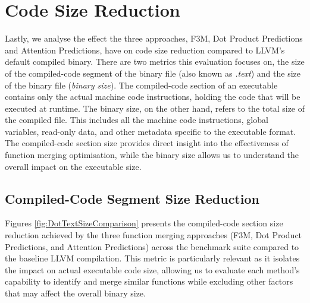 \section{Code Size Reduction} \label{Eval:CodeSizeReduction}
Lastly, we analyse the effect the three approaches, F3M, Dot Product Predictions and Attention Predictions, have on code size reduction compared to LLVM's default compiled binary. There are two metrics this evaluation focuses on, the size of the compiled-code segment of the binary file (also known as \textit{.text}) and the size of the binary file (\textit{binary size}). The compiled-code section of an executable contains only the actual machine code instructions, holding the code that will be executed at runtime. The binary size, on the other hand, refers to the total size of the compiled file. This includes all the machine code instructions, global variables, read-only data, and other metadata specific to the executable format. The compiled-code section size provides direct insight into the effectiveness of function merging optimisation, while the binary size allows us to understand the overall impact on the executable size.


\subsection{Compiled-Code Segment Size Reduction}
Figures \ref{fig:DotTextSizeComparison} presents the compiled-code section size reduction achieved by the three function merging approaches (F3M, Dot Product Predictions, and Attention Predictions) across the benchmark suite compared to the baseline LLVM compilation. This metric is particularly relevant as it isolates the impact on actual executable code size, allowing us to evaluate each method's capability to identify and merge similar functions while excluding other factors that may affect the overall binary size.


